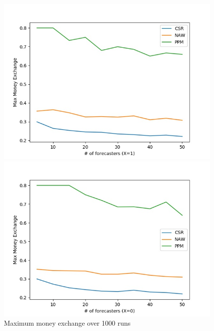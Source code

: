 \documentclass[english,10pt]{article}
\begin{document}
\begin{enumerate}
\begin{enumerate}
        	\begin{figure}[H]
        	\centering
        	\begin{minipage}{0.48\textwidth}
        	\includegraphics[width = \textwidth]{(Beta_0dot3_0dot3)Max_MnEx(X=1).jpg}
        	\end{minipage}
        	\begin{minipage}{0.48\textwidth}
        	\includegraphics[width = \textwidth]{(Beta_0dot3_0dot3)Max_MnEx(X=0).jpg}
        	\end{minipage}
        	\caption{Maximum money exchange over 1000 runs}
        	\end{figure}
        	

\end{enumerate}
\end{enumerate}
\end{document}
